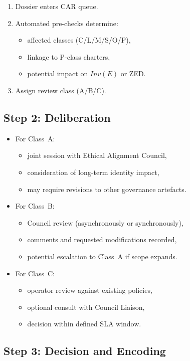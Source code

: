 \begin{enumerate}
    \item Dossier enters CAR queue.
    \item Automated pre-checks determine:
    \begin{itemize}
        \item affected classes (C/L/M/S/O/P),
        \item linkage to P-class charters,
        \item potential impact on $Inv(E)$ or ZED.
    \end{itemize}
    \item Assign review class (A/B/C).
\end{enumerate}

\subsection{Step 2: Deliberation}

\begin{itemize}
    \item For Class~A:
    \begin{itemize}
        \item joint session with Ethical Alignment Council,
        \item consideration of long-term identity impact,
        \item may require revisions to other governance artefacts.
    \end{itemize}
    \item For Class~B:
    \begin{itemize}
        \item Council review (asynchronously or synchronously),
        \item comments and requested modifications recorded,
        \item potential escalation to Class~A if scope expands.
    \end{itemize}
    \item For Class~C:
    \begin{itemize}
        \item operator review against existing policies,
        \item optional consult with Council Liaison,
        \item decision within defined SLA window.
    \end{itemize}
\end{itemize}

\subsection{Step 3: Decision and Encoding}

